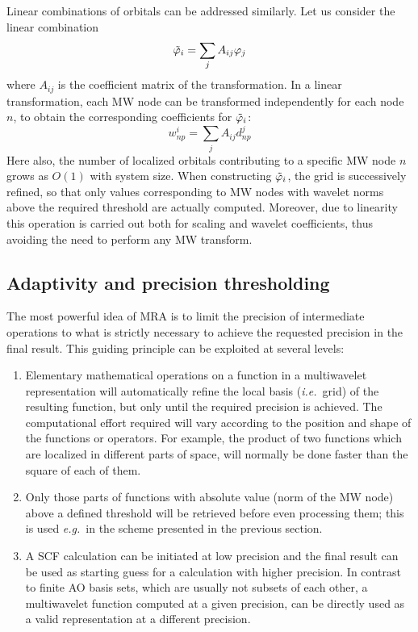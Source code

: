 \documentclass[journal=jctcce, manuscript=article]{achemso}
\begin{document}
Linear combinations of orbitals can be addressed similarly. Let us consider the linear combination
\begin{equation}
  \tilde{\varphi}_i = \sum_{j} A_{ij} \varphi_j
\end{equation}
where $A_{ij}$ is the coefficient matrix of the transformation.
In a linear transformation, each \ac{MW} node can be transformed independently for each node $n$, to obtain the corresponding coefficients for $\tilde{\varphi}_i$:
\begin{equation}
  w^i_{np} = \sum_{j} A_{ij} d^j_{np}
\end{equation}
Here also, the number of localized orbitals contributing to a specific \ac{MW} node $n$ grows as $O(1)$ with system size. 
When constructing $\tilde{\varphi}_i$, the grid is successively refined, so that only values corresponding to \ac{MW} nodes with wavelet norms above the required threshold are actually computed.
Moreover, due to linearity this operation is carried out both for scaling and wavelet coefficients, thus avoiding the need to perform any \ac{MW} transform.

\subsection{Adaptivity and precision thresholding}\label{sec:adaptivity-screening}

The most powerful idea of \ac{MRA} is to limit the precision of intermediate operations to what is strictly necessary to achieve the requested precision in the final result. This guiding principle can be exploited at several levels:

\begin{enumerate}
    \item Elementary mathematical operations on a function in a multiwavelet representation will automatically refine the local basis (\emph{i.e.}~grid) of the resulting function, but only until the required precision is achieved. The computational effort required will vary according to the position and shape of the functions or operators. For example, the product of two functions which are localized in different parts of space, will normally be done faster than the square of each of them.
    \item Only those parts of functions with absolute value (norm of the \ac{MW} node) above a defined threshold will be retrieved before even processing them; this is used \emph{e.g.}~in the scheme presented in the previous section.
    \item A \ac{SCF} calculation can be initiated at low precision and the final result can be used as starting guess for a calculation with higher precision. In contrast to finite \ac{AO} basis sets, which are usually not subsets of each other, a multiwavelet function computed at a given precision, can be directly used as a valid representation at a different precision.
\end{enumerate}
\end{document}
